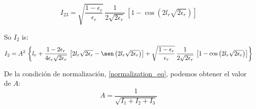 \begin{equation}
\label{I23}
I_{23} =
\sqrt{\frac{1-\epsilon_r}{\epsilon_r}}\,
\frac{1}{2\sqrt{2\epsilon_r}}\,
\left[1 - \cos\left(2l_r\sqrt{2\epsilon_r}\right)\right]
\end{equation}

So $I_2$ is:
\begin{equation}
\label{I2}
I_2 
= A^2\,
\left\lbrace
l_r
+
\frac{1-2\epsilon_r}{4\epsilon_r\sqrt{2\epsilon_r}}\,
\left[
2l_r\sqrt{2\epsilon_r}
- \sen\left(2l_r\sqrt{2\epsilon_r}\right)
\right]
+
\sqrt{\frac{1-\epsilon_r}{\epsilon_r}}\,
\frac{1}{2\sqrt{2\epsilon_r}}\,
\left[1 - \cos\left(2l_r\sqrt{2\epsilon_r}\right)\right]
\right\rbrace
\end{equation}

De la condición de normalización, \ref{normalization_eq}, podemos obtener el
valor de $A$:
\[
A = \frac{1}{\sqrt{I_1 + I_2 + I_3}}
\]

